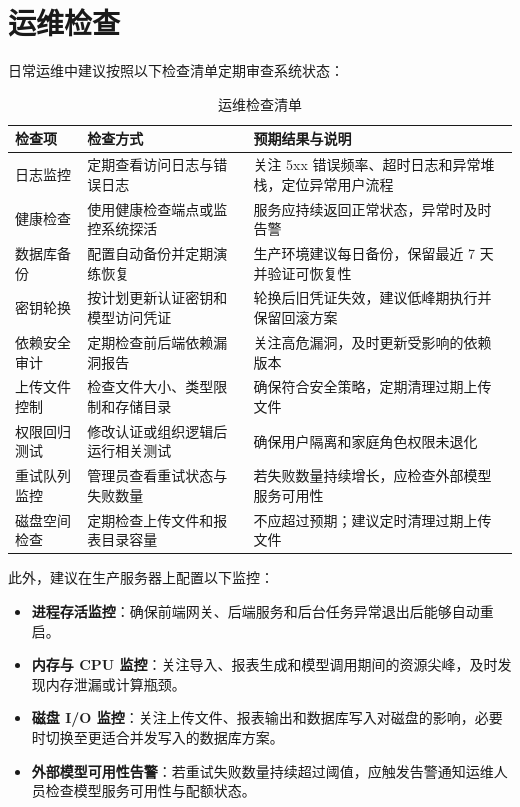 \section{运维检查}

日常运维中建议按照以下检查清单定期审查系统状态：

\begin{table}[H]
  \centering
  \small
  \caption{运维检查清单}
  \label{tab:ops-checklist}
  \begin{tabular}{@{}p{2.4cm} p{5.0cm} p{5.4cm}@{}}
    \toprule
    \textbf{检查项} & \textbf{检查方式} & \textbf{预期结果与说明} \\
    \midrule
    日志监控 & 定期查看访问日志与错误日志 & 关注 5xx 错误频率、超时日志和异常堆栈，定位异常用户流程 \\
    \hline
    健康检查 & 使用健康检查端点或监控系统探活 & 服务应持续返回正常状态，异常时及时告警 \\
    \hline
    数据库备份 & 配置自动备份并定期演练恢复 & 生产环境建议每日备份，保留最近 7 天并验证可恢复性 \\
    \hline
    密钥轮换 & 按计划更新认证密钥和模型访问凭证 & 轮换后旧凭证失效，建议低峰期执行并保留回滚方案 \\
    \hline
    依赖安全审计 & 定期检查前后端依赖漏洞报告 & 关注高危漏洞，及时更新受影响的依赖版本 \\
    \hline
    上传文件控制 & 检查文件大小、类型限制和存储目录 & 确保符合安全策略，定期清理过期上传文件 \\
    \hline
    权限回归测试 & 修改认证或组织逻辑后运行相关测试 & 确保用户隔离和家庭角色权限未退化 \\
    \hline
    重试队列监控 & 管理员查看重试状态与失败数量 & 若失败数量持续增长，应检查外部模型服务可用性 \\
    \hline
    磁盘空间检查 & 定期检查上传文件和报表目录容量 & 不应超过预期；建议定时清理过期上传文件 \\
    \bottomrule
  \end{tabular}
\end{table}

此外，建议在生产服务器上配置以下监控：

\begin{itemize}
  \item \textbf{进程存活监控}：确保前端网关、后端服务和后台任务异常退出后能够自动重启。
  \item \textbf{内存与 CPU 监控}：关注导入、报表生成和模型调用期间的资源尖峰，及时发现内存泄漏或计算瓶颈。
  \item \textbf{磁盘 I/O 监控}：关注上传文件、报表输出和数据库写入对磁盘的影响，必要时切换至更适合并发写入的数据库方案。
  \item \textbf{外部模型可用性告警}：若重试失败数量持续超过阈值，应触发告警通知运维人员检查模型服务可用性与配额状态。
\end{itemize}
